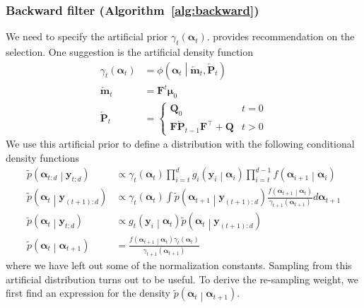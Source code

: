 \documentclass[notitlepage]{article}
\renewcommand{\vec}[1]{\bm{#1}}
\newcommand{\vecLarrow}[1]{\overleftarrow{\vec{#1}}}
\newcommand{\mat}[1]{\mathbf{#1}}
\newcommand{\matLarrow}[1]{\overleftarrow{\mat{#1}}}
\newcommand{\Lparen}[1]{\left( #1\right)}
\newcommand{\Cond}[2]{ #1 \middle\vert  #2}
\newcommand{\optor}[2]{#1\Lparen{#2}}
\newcommand{\optorC}[3]{\optor{#1}{\Cond{#2}{#3}}}
\newcommand{\pdenstC}[2]{\optorC{\widetilde p}{#1}{#2}}
\newcommand{\normaldC}[3]{\optorC{\phi}{#1}{#2,#3}}
\newcommand{\nPeriods}{d}
\begin{document}
\subsubsection*{Backward filter (Algorithm~\ref{alg:backward})}
We need to specify the artificial prior $\gamma_t\Lparen{\vec{\alpha}_t}$. 
\citet[page 69 and 70]{briers09} provides recommendation on the selection. One suggestion is the artificial density function %
%
\begin{equation}\begin{split}\label{eq:artfiPrior}
	\gamma_t\Lparen{\vec{\alpha}_t} &=
		\normaldC{\vec{\alpha}_t}{\vecLarrow{m}_t}{\matLarrow{P}_t} \\
%
	\vecLarrow{m}_t &= \mat{F}^t\vec\mu_0 \\
%
	\matLarrow{P}_t &= \left\{
		\begin{matrix} \mat{Q}_0 & t = 0 \\ \mat{F}\matLarrow{P}_{t - 1}\mat{F}^\top + 
		\mat{Q} & t > 0   \end{matrix} \right.
\end{split}\end{equation}%
%
We use this artificial prior to define a distribution with the following conditional density functions%
%
\begin{align}
\pdenstC{\vec{\alpha}_{t:d}}{\vec{y}_{t:\nPeriods}} &\propto 
	\gamma_t \Lparen{\vec{\alpha}_t}
	\prod_{i=t}^d \optorC{g_i}{\vec y_i}{\vec\alpha_i}
	\prod_{i=t}^{d-1} \optorC{f}{\vec\alpha_{i + 1}}{\vec\alpha_i} \nonumber\\
\pdenstC{\vec{\alpha}_t}{\vec{y}_{(t + 1):\nPeriods}} & \propto
	\gamma_t(\vec\alpha_t)
	\int \pdenstC{\vec{\alpha}_{t+1}}{\vec{y}_{(t+1):\nPeriods}}
	\frac{
		\optorC{f}{\vec\alpha_{t + 1}}{\vec\alpha_t}%
	}{
		\gamma_{t+1}(\vec\alpha_{t+1})	
	}d\vec\alpha_{t+1} \nonumber\\
\pdenstC{\vec{\alpha}_t}{\vec{y}_{t:\nPeriods}} &\propto 
	\optorC{g_t}{\vec y_i}{\vec\alpha_t}
	\pdenstC{\vec{\alpha}_t}{\vec{y}_{(t + 1):\nPeriods}} \nonumber\\
\pdenstC{\vec{\alpha}_t}{\vec{\alpha}_{t +1}} &= \label{eq:bwTrans}
	\frac{
		\optorC{f}{\vec\alpha_{t+1}}{\vec\alpha_t}
		\gamma_t(\vec\alpha_t)
	}{\gamma_{t+1}(\vec\alpha_{t + 1})}
\end{align}%
%
where we have left out some of the normalization constants. 
Sampling from this artificial distribution turns out to be useful.
To derive the re-sampling weight, we first find an expression for the density $\pdenstC{\vec{\alpha}_t}{\vec{\alpha}_{t + 1}}$. 
\end{document}
